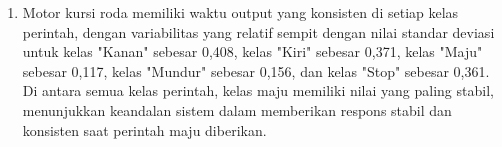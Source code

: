 \begin{enumerate}
  \item Motor kursi roda memiliki waktu output yang konsisten di setiap kelas perintah, dengan variabilitas yang relatif sempit dengan nilai standar deviasi untuk kelas "Kanan" sebesar 0,408, kelas "Kiri" sebesar 0,371, kelas "Maju" sebesar 0,117, kelas "Mundur" sebesar 0,156, dan kelas "Stop" sebesar 0,361. Di antara semua kelas perintah, kelas maju memiliki nilai yang paling stabil, menunjukkan keandalan sistem dalam memberikan respons stabil dan konsisten saat perintah maju diberikan.

\end{enumerate}